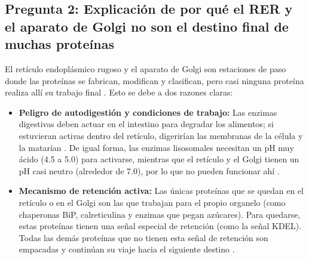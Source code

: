 \documentclass[12pt,spanish,letterpaper,oneside]{article}
\begin{document}
\subsection{Pregunta 2: Explicación de por qué el RER y el aparato de Golgi no son el destino final de muchas proteínas}
El retículo endoplásmico rugoso y el aparato de Golgi son estaciones de paso donde las proteínas se fabrican, modifican y clasifican, pero casi ninguna proteína realiza allí su trabajo final \parencite{lodish2021molecular}. Esto se debe a dos razones claras:
\begin{itemize}
    \item \textbf{Peligro de autodigestión y condiciones de trabajo:} Las enzimas digestivas deben actuar en el intestino para degradar los alimentos; si estuvieran activas dentro del retículo, digerirían las membranas de la célula y la matarían \parencite{kierszenbaum2020histologia}. De igual forma, las enzimas lisosomales necesitan un pH muy ácido (4.5 a 5.0) para activarse, mientras que el retículo y el Golgi tienen un pH casi neutro (alrededor de 7.0), por lo que no pueden funcionar ahí \parencite{lieberman2018marks}.
    \item \textbf{Mecanismo de retención activa:} Las únicas proteínas que se quedan en el retículo o en el Golgi son las que trabajan para el propio organelo (como chaperonas BiP, calreticulina y enzimas que pegan azúcares). Para quedarse, estas proteínas tienen una señal especial de retención (como la señal KDEL). Todas las demás proteínas que no tienen esta señal de retención son empacadas y continúan su viaje hacia el siguiente destino \parencite{alberts2022molecular, fortoul2020histologia}.
\end{itemize}
\end{document}
